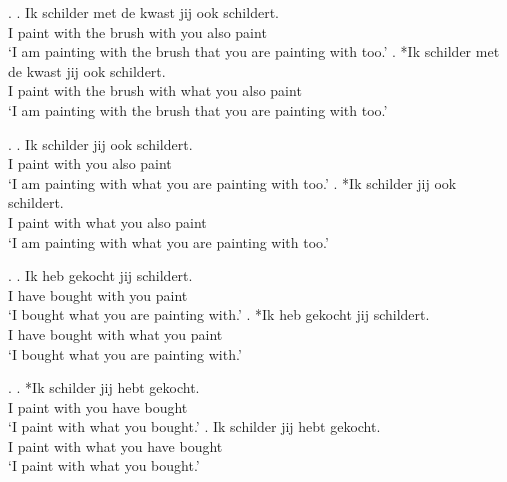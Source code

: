 \documentclass[xcolor=dvipsnames,10pt]{beamer}
\begin{document}
\begin{frame}

\ex.\label{ex:headed}
\ag. Ik schilder met de kwast   jij ook schildert.\\
 I paint with the brush  with you also paint\\
 `I am painting with the brush that you are painting with too.'
\bg. *Ik schilder met de kwast   jij ook schildert.\\
 I paint with the brush with what you also paint\\
 `I am painting with the brush that you are painting with too.'

 \pause

\ex.\label{ex:headless}
\ag. Ik schilder   jij ook schildert.\\
 I paint  with you also paint\\
 `I am painting with what you are painting with too.'
\bg. *Ik schilder   jij ook schildert.\\
 I paint with what you also paint\\
 `I am painting with what you are painting with too.'

\end{frame}


\begin{frame}

\ex.
\ag. Ik heb gekocht   jij schildert.\\
 I have bought  with you paint\\
 `I bought what you are painting with.'\label{ex:gekochtwaar-mee}
\bg. *Ik heb gekocht   jij schildert.\\
 I have bought with what you paint\\
 `I bought what you are painting with.'\label{ex:gekochtmetwat}

\pause

\ex.\label{ex:schildermet}
\ag. *Ik schilder   jij hebt gekocht.\\
 I paint  with you have bought\\
 `I paint with what you bought.'\label{ex:schilderwaar-mee}
\bg. Ik schilder   jij hebt gekocht.\\
 I paint with what you have bought\\
 `I paint with what you bought.'\label{ex:schildermetwat}


\end{frame}
\end{document}
